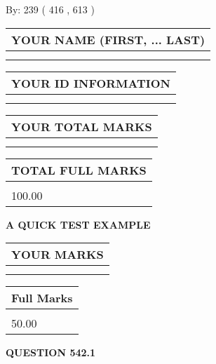 \documentclass[12pt]{article}
\begin{document}
   
\hspace{1.0in} By: 
 239 ( 416 ,  613 )
   
   
   
   
\newpage 
\setcounter{page}{ 
   542001 } 
   
   
   
   
\noindent\begin{tabular}{|l|}
\hline
YOUR NAME (FIRST, ... LAST)  \\
\hline
 \\ 
 \\ 
\hline
\end{tabular}
\hspace{0.05in} \begin{tabular}{|l|}
\hline
 YOUR   ID   INFORMATION  \\
\hline
 \\ 
 \\ 
\hline
\end{tabular}
   
   
\vspace{0.2in}\noindent\begin{tabular}{|l|}
\hline
YOUR TOTAL MARKS  \\
\hline
 \\ 
 \\ 
\hline
\end{tabular}
\hspace{0.05in} \begin{tabular}{|l|}
\hline
TOTAL FULL MARKS  \\
\hline
 \\ 
100.00 \\
\hline
\end{tabular}
   
   
 \vspace{0.2in}
{\LARGE {\textbf{ A QUICK TEST EXAMPLE}}}
   
   
  
\vspace{0.2in}
  
\noindent\begin{tabular}{|l|}
\hline
 YOUR MARKS  \\
\hline
 \\ 
 \\ 
\hline
\end{tabular}
\hspace{0.05in} \begin{tabular}{|l|}
\hline
 Full Marks  \\
\hline
 \\ 
50.00 \\
\hline
\end{tabular}
{\textbf{\Large{QUESTION
542.1 
}}}
  
\end{document}

